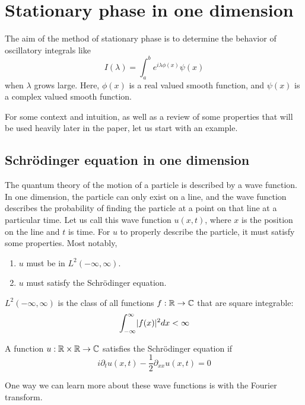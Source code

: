 \section{Stationary phase in one dimension}
The aim of the method of stationary phase is to determine the behavior of oscillatory integrals like
\begin{equation}
\label{oscillatory_1}
I(\lambda) = \int_a^b e^{i\lambda\phi(x)} \psi(x)
\end{equation}
when $\lambda$ grows large. Here, $\phi(x)$ is a real valued smooth function, and $\psi(x)$ is a complex valued smooth function.

For some context and intuition, as well as a review of some properties that will be used heavily later in the paper, let us start with an example.

\subsection{Schr{\"o}dinger equation in one dimension}

The quantum theory of the motion of a particle is described by a wave function. In one dimension, the particle can only exist on a line, and the wave function describes the probability of finding the particle at a point on that line at a particular time. Let us call this wave function $u(x, t)$, where $x$ is the position on the line and $t$ is time. For $u$ to properly describe the particle, it must satisfy some properties. Most notably,

\begin{enumerate}
	\item $u$ must be in $L^2(-\infty, \infty)$.
	\item $u$ must satisfy the Schr{\"o}dinger equation.
\end{enumerate}

\begin{definition}
	$L^2(-\infty, \infty)$ is the class of all functions $f : \mathbb{R} \to \mathbb{C}$ that are square integrable:
	\[
	\int_{-\infty}^\infty \lvert f(x)\rvert^2 dx < \infty
	\]
\end{definition}
\begin{definition}
	A function $u : \mathbb{R} \times \mathbb{R} \to \mathbb{C}$ satisfies the Schr{\"o}dinger equation if
	\[
	i\partial_t u(x, t) - \frac{1}{2}\partial_{xx}u(x, t) = 0 
	\]
\end{definition}\cite{Strichartz}

One way we can learn more about these wave functions is with the Fourier transform.


